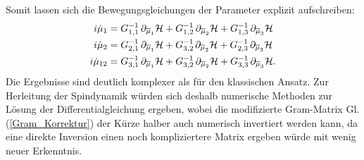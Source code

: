 Somit lassen sich die Bewegungsgleichungen der Parameter explizit aufschreiben:
\begin{align}
    i\dot{\mu}_1 &= G_{1,1}^{-1}\thinspace \partial_{\overline{\mu}_1}\mathcal{H} + G_{1,2}^{-1}\thinspace\partial_{\overline{\mu}_2}\mathcal{H} + G_{1,3}^{-1}\thinspace\partial_{\overline{\mu}_3}\mathcal{H}\label{QK_DGL1} \\
    i\dot{\mu}_2 &= G_{2,1}^{-1}\thinspace\partial_{\overline{\mu}_1}\mathcal{H} + G_{3,2}^{-1\thinspace}\partial_{\overline{\mu}_2}\mathcal{H} + G_{2,3}^{-1}\thinspace\partial_{\overline{\mu}_3}\mathcal{H} \\
    i\dot{\mu}_{12} &= G_{3,1}^{-1}\thinspace\partial_{\overline{\mu}_1}\mathcal{H} + G_{3,2}^{-1}\thinspace\partial_{\overline{\mu}_2}\mathcal{H} + G_{3,3}^{-1}\thinspace\partial_{\overline{\mu}_3}\mathcal{H} \label{QK_DGL3}.
\end{align}
Die Ergebnisse sind deutlich komplexer als für den klassischen Ansatz. Zur Herleitung der Spindynamik würden sich deshalb numerische Methoden zur Lösung der 
Differentialgleichung ergeben, wobei die modifizierte Gram-Matrix Gl. (\ref{Gram_Korrektur}) der Kürze halber auch numerisch invertiert werden kann, da eine 
direkte Inversion einen noch kompliziertere Matrix ergeben würde mit wenig neuer Erkenntnis.

